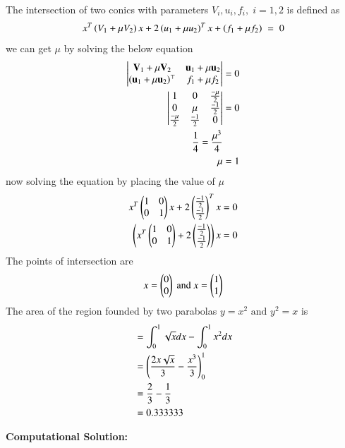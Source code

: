 \documentclass[journal]{IEEEtran}
\begin{document}
The intersection of two conics with parameters $V_i,u_i,f_i,\;i= 1,2$ is defined as
\begin{align}
x^T\left(V_1+\mu V_2\right)x+2\left(u_1+\mu u_2\right)^T x + \left(f_1+\mu f_2\right)\;=\;0
\end{align}
we can get $\mu$ by solving the below equation
\begin{align}
    \begin{vmatrix}\mathbf{V}_1 + \mu\mathbf{V}_2 & \mathbf{u}_1 + \mu\mathbf{u}_2 \\ (\mathbf{u}_1+ \mu\mathbf{u}_2)^\top & f_1 + \mu f_2\end{vmatrix} &= 0 \\
    \begin{vmatrix}1& 0 & \frac{-\mu}{2} \\0 & \mu & \frac{-1}{2}\\ \frac{-\mu}{2} & \frac{-1}{2} & 0\end{vmatrix}&=0\\
    \frac{1}{4}=\frac{\mu^3}{4}\\
    \mu&=1
\end{align}
now solving the equation  by placing the value of $\mu$
\begin{align}
    x^T\begin{pmatrix}1 & 0 \\0 & 1\end{pmatrix}x+2\begin{pmatrix}\frac{-1}{2} \\\frac{-1}{2}\end{pmatrix}^Tx=0\\
    \left(x^T\begin{pmatrix}1 & 0 \\0 & 1\end{pmatrix}+2\begin{pmatrix}\frac{-1}{2} \\\frac{-1}{2}\end{pmatrix}\right)x=0
\end{align}
The points of intersection are
\begin{align}
x=\begin{pmatrix}0\\0\end{pmatrix}\text{ and }x=\begin{pmatrix}1\\1\end{pmatrix}
\end{align}
The area of the region founded by two parabolas $y=x^2 \text{ and } y^2=x $ is
\begin{align}
    &=\int_{0}^{1} \sqrt{x}dx-\int_{0}^{1}  x^2 dx\\
    &=\left(\frac{2x\sqrt{x}}{3}-\frac{x^3}{3}\right)_{0}^{1}\\
    &=\frac{2}{3}-\frac{1}{3}\\
    &=0.333333
\end{align}

\textbf{Computational Solution:}\\
\end{document}
